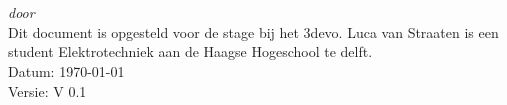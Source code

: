 \begin{titlepage}
    \vspace*{5cm}
    \makeatletter
    \begin{center}
        \begin{Huge}
            \@title
        \end{Huge}\\[0.1cm]
        \begin{Large}
            \@subtitle
        \end{Large}\\
        \emph{door}\\
        \@author
        \vfill
        Dit document is opgesteld voor de stage bij het 3devo. Luca van
        Straaten is een student Elektrotechniek aan de Haagse Hogeschool te
        delft.\\
        \vspace{.5cm}
        Datum: \today\\
        Versie: V 0.1
    \end{center}
    \makeatother
\end{titlepage}

\newpage
